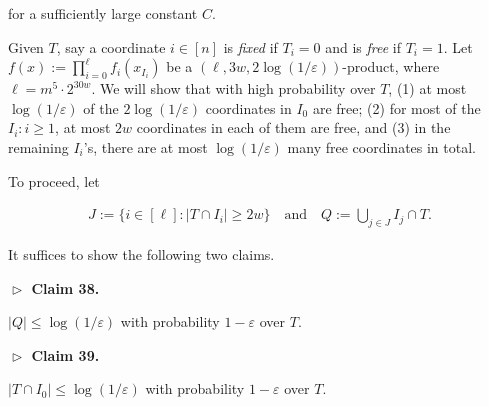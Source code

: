 \documentclass[10pt,a4paper]{article}
\begin{document}
for a sufficiently large constant $C$.\par




Given $T$, say a coordinate $i\in[n]$ is \emph{fixed} if $T_{i}=0$ and is \emph{free} if $T_{i}=1$.
Let $f(x):=\prod_{i=0}^{\ell}f_{i}(x_{I_{i}})$ be a $(\ell,3w,2\log(1/\varepsilon))$-product, where $\ell=m^{5}\cdot 2^{30w}$.
We will show that with high probability over $T$, (1) at most $\log(1/\varepsilon)$ of the $2\log(1/\varepsilon)$ coordinates in $I_{0}$ are free; (2) for most of the $I_{i}:i\geq 1$, at most $2w$ coordinates in each of them are free, and (3) in the remaining $I_{i}$’s, there are at most $\log(1/\varepsilon)$ many free coordinates in total.\par




To proceed, let\par


\[\begin{gathered}
J:=\{i\in[\ell]:\lvert T\cap I_{i}\rvert\geq 2w\}\quad\text{and}\quad Q:=\bigcup_{j\in J}I_{j}\cap T.
\end{gathered}\]


It suffices to show the following two claims.\par





\par\medskip\noindent\textbf{
$\vartriangleright$ Claim 38. }\par



$\lvert Q\rvert\leq\log(1/\varepsilon)$ with probability $1-\varepsilon$ over $T$.\par







\par\medskip\noindent\textbf{
$\vartriangleright$ Claim 39. }\par



$\lvert T\cap I_{0}\rvert\leq\log(1/\varepsilon)$ with probability $1-\varepsilon$ over $T$.\par



\end{document}
